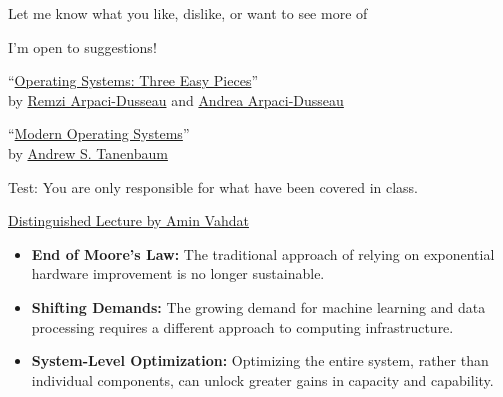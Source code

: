 \begin{slide}


    Let me know what you like, dislike, or want to see more of
    \bigskip
    
    I'm open to suggestions!

\end{slide}

\begin{slide}


    ``\href{https://pages.cs.wisc.edu/~remzi/OSTEP/}
	   {Operating Systems: Three Easy Pieces}'' \\
    by \href{http://www.cs.wisc.edu/~remzi/}{Remzi Arpaci-Dusseau}
    and \href{http://www.cs.wisc.edu/~dusseau/}{Andrea Arpaci-Dusseau}
    \bigskip

    ``\href{https://en.wikipedia.org/wiki/Modern_Operating_Systems}
           {Modern Operating Systems}'' \\
    by \href{https://en.wikipedia.org/wiki/Andrew_S._Tanenbaum}{Andrew S. Tanenbaum}
    \bigskip
							      
    Test: You are only responsible for what have been covered in class.

\end{slide}

\begin{slide}


    \href{https://youtu.be/9lBbqH_1KS4?feature=shared}
           {Distinguished Lecture by Amin Vahdat}
    \bigskip

    \begin{itemize}
        \item \textbf{End of Moore's Law:} The traditional approach of relying on exponential hardware improvement is no longer sustainable.
        \item \textbf{Shifting Demands:} The growing demand for machine learning and data processing requires a different approach to computing infrastructure.
        \item \textbf{System-Level Optimization:} Optimizing the entire system, rather than individual components, can unlock greater gains in capacity and capability.
    \end{itemize}

\end{slide}

